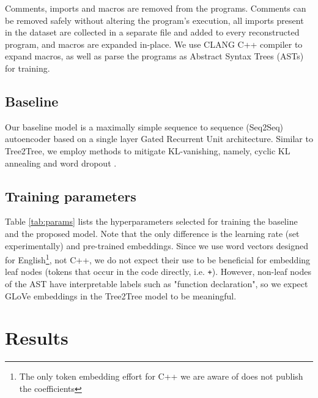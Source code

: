 Comments, imports and macros are removed from the programs.
Comments can be removed safely without altering the program's execution, all imports present in the dataset are collected in a separate file and added to every reconstructed program, and macros are expanded in-place.
We use CLANG C++ compiler to expand macros, as well as parse the programs as Abstract Syntax Trees (ASTs) for training.

\subsection{Baseline}

Our baseline model is a maximally simple sequence to sequence (Seq2Seq) autoencoder based on a single layer Gated Recurrent Unit \cite{chungEmpiricalEvaluationGated2014} architecture. Similar to Tree2Tree, we employ methods to mitigate KL-vanishing, namely, cyclic KL annealing \cite{fuCyclicalAnnealingSchedule2019} and word dropout \cite{bowmanGeneratingSentencesContinuous2015}.

\subsection{Training parameters}

\begin{table}
\centering

\caption{Training hyperparameters for baseline and Tree2Tree models}
\label{tab:params}
\end{table}

Table \ref{tab:params} lists the hyperparameters selected for training the baseline and the proposed model.
Note that the only difference is the learning rate (set experimentally) and pre-trained embeddings.
Since we use word vectors designed for English\footnote{The only token embedding effort for C++ we are aware of \cite{harerAutomatedSoftwareVulnerability2018} does not publish the coefficients}, not C++, we do not expect their use to be beneficial for embedding leaf nodes (tokens that occur in the code directly, i.e. \verb|+|).
However, non-leaf nodes of the AST have interpretable labels such as "function declaration", so we expect GLoVe \cite{penningtonGloveGlobalVectors2014} embeddings in the Tree2Tree model to be meaningful.

\newpage
\section{Results}
\label{sec:tree2tree-results}

